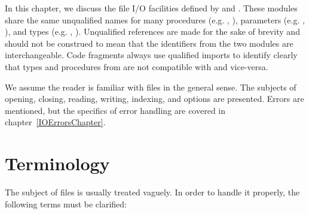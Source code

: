 In this chapter, we discuss the file I/O facilities defined by 
 and .  These modules share the
same unqualified names for many procedures (e.g. , ),
parameters (e.g. , ), and types
(e.g. , ).
Unqualified references are made for the sake of brevity and should not
be construed to mean that the identifiers from the two modules are 
interchangeable.  Code fragments always use qualified imports to identify
clearly that types and procedures from  are not compatible
with  and vice-versa.

We assume the reader is familiar with files in the general sense.
The subjects of opening, closing, reading, writing, indexing, and options
are presented.  Errors are mentioned, but the specifics of error handling
are covered in chapter~\ref{IOErrorsChapter}.

\section{Terminology}

The subject of files is usually treated vaguely. 
In order to handle it properly, the following terms must be clarified:

